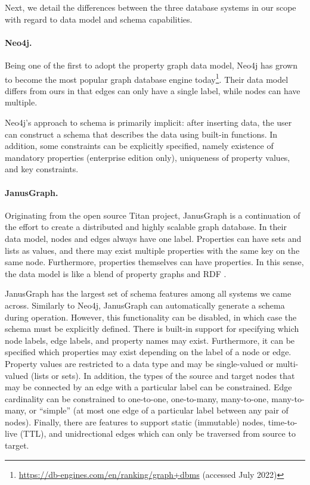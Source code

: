 \documentclass{article}
\theoremstyle{definition}
\begin{document}
Next, we detail the differences between the three database systems in our scope with regard to data model and schema capabilities.

\paragraph{Neo4j.} Being one of the first to adopt the property graph data model, Neo4j has grown to become the most popular graph database engine today\footnote{\url{https://db-engines.com/en/ranking/graph+dbms} (accessed July 2022)}. Their data model differs from ours in that edges can only have a single label, while nodes can have multiple.

Neo4j's approach to schema is primarily implicit: after inserting data, the user can construct a schema that describes the data using built-in functions. In addition, some constraints can be explicitly specified, namely existence of mandatory properties (enterprise edition only), uniqueness of property values, and key constraints.

\paragraph{JanusGraph.} Originating from the open source Titan project, JanusGraph is a continuation of the effort to create a distributed and highly scalable graph database. In their data model, nodes and edges always have one label. Properties can have sets and lists as values, and there may exist multiple properties with the same key on the same node. Furthermore, properties themselves can have properties. In this sense, the data model is like a blend of property graphs and RDF \citep{pan2009rdf}.

JanusGraph has the largest set of schema features among all systems we came across. Similarly to Neo4j, JanusGraph can automatically generate a schema during operation. However, this functionality can be disabled, in which case the schema must be explicitly defined. There is built-in support for specifying which node labels, edge labels, and property names may exist. Furthermore, it can be specified which properties may exist depending on the label of a node or edge. Property values are restricted to a data type and may be single-valued or multi-valued (lists or sets). In addition, the types of the source and target nodes that may be connected by an edge with a particular label can be constrained. Edge cardinality can be constrained to one-to-one, one-to-many, many-to-one, many-to-many, or ``simple'' (at most one edge of a particular label between any pair of nodes). Finally, there are features to support static (immutable) nodes, time-to-live (TTL), and unidrectional edges which can only be traversed from source to target.
\end{document}
